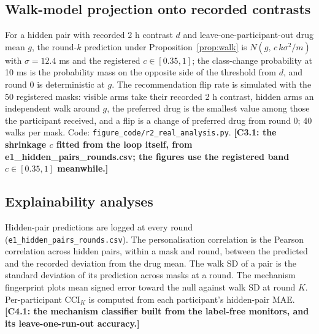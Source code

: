 \documentclass[11pt,a4paper]{article}
\newcommand{\tbd}[1]{{\color{red}\textbf{[#1]}}}
\newcommand{\CCI}{\mathrm{CCI}}
\begin{document}
\subsection{Walk-model projection onto recorded contrasts}
For a hidden pair with recorded 2 h contrast $d$ and leave-one-participant-out drug mean $g$, the round-$k$ prediction under Proposition~\ref{prop:walk} is $N(g,\,c\,k\sigma^2/m)$ with $\sigma=12.4$ ms and the registered $c\in[0.35,1]$; the class-change probability at 10 ms is the probability mass on the opposite side of the threshold from $d$, and round 0 is deterministic at $g$. The recommendation flip rate is simulated with the 50 registered masks: visible arms take their recorded 2 h contrast, hidden arms an independent walk around $g$, the preferred drug is the smallest value among those the participant received, and a flip is a change of preferred drug from round 0; 40 walks per mask. Code: \texttt{figure\_code/r2\_real\_analysis.py}. \tbd{C3.1: the shrinkage $c$ fitted from the loop itself, from e1\_hidden\_pairs\_rounds.csv; the figures use the registered band $c\in[0.35,1]$ meanwhile.}

\subsection{Explainability analyses}
Hidden-pair predictions are logged at every round (\texttt{e1\_hidden\_pairs\_rounds.csv}). The personalisation correlation is the Pearson correlation across hidden pairs, within a mask and round, between the predicted and the recorded deviation from the drug mean. The walk SD of a pair is the standard deviation of its prediction across masks at a round. The mechanism fingerprint plots mean signed error toward the null against walk SD at round $K$. Per-participant $\CCI_K$ is computed from each participant's hidden-pair MAE. \tbd{C4.1: the mechanism classifier built from the label-free monitors, and its leave-one-run-out accuracy.}
\end{document}
